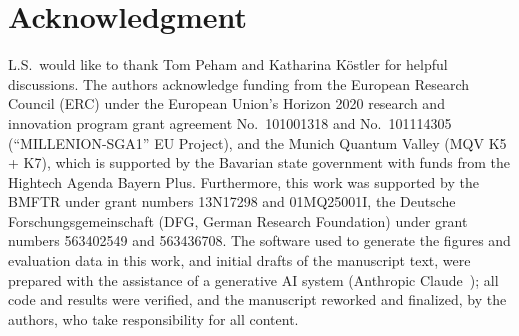 \documentclass[conference]{IEEEtran}
\begin{document}
\section*{Acknowledgment}
\begingroup\scriptsize\linespread{0.78}\selectfont
L.S.\ would like to thank Tom Peham and Katharina K\"ostler for helpful
discussions.
The authors acknowledge funding from the European Research Council (ERC) under
the European Union's Horizon 2020 research and innovation program grant
agreement No.~101001318 and No.~101114305 (``MILLENION-SGA1'' EU Project), and
the Munich Quantum Valley (MQV K5 + K7), which is supported by the Bavarian
state government with funds from the Hightech Agenda Bayern Plus. Furthermore,
this work was supported by the BMFTR under grant numbers 13N17298 and
01MQ25001I, the Deutsche Forschungsgemeinschaft (DFG, German Research
Foundation) under grant numbers 563402549 and 563436708.
The software used to generate the figures and evaluation data in this work, and
initial drafts of the manuscript text, were prepared with the assistance of a
generative AI system (Anthropic Claude~\cite{ai:claude}); all code and results
were verified, and the manuscript reworked and finalized, by the authors, who
take responsibility for all content.\par
\endgroup


\begingroup\linespread{0.97}\selectfont

\endgroup
\end{document}
